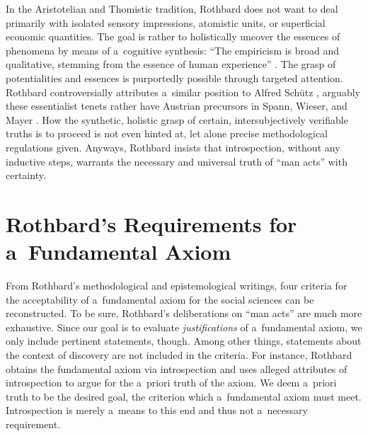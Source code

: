 In the Aristotelian and Thomistic tradition, Rothbard does not want to deal primarily with isolated sensory impressions, atomistic units, or superficial economic quantities. The goal is rather to holistically uncover the essences of phenomena by means of a~cognitive synthesis: ``The empiricism is broad and qualitative, stemming from the essence of human experience'' 
\parencite[][p.xvi]{mises_preface_2007}. %
 The grasp of potentialities and essences is purportedly possible through targeted attention. Rothbard controversially attributes a~similar position to Alfred Schütz 
\parencites[][]{rothbard_praxeology_2011}[][]{rothbard_praxeology:_1976}, %
 arguably these essentialist tenets rather have Austrian precursors in Spann, Wieser, and Mayer 
\parencites[][]{milford_abkopplung_1997}[][]{linsbichler_viel_2022}. %
 How the synthetic, holistic grasp of certain, intersubjectively verifiable truths is to proceed is not even hinted at, let alone precise methodological regulations given. Anyways, Rothbard insists that introspection, without any inductive steps, warrants the necessary and universal truth of ``man acts'' with certainty.



\section{Rothbard's Requirements for a~Fundamental Axiom }

From Rothbard's methodological and epistemological writings, four criteria for the acceptability of a~fundamental axiom for the social sciences can be reconstructed. To be sure, Rothbard's deliberations on ``man acts'' are much more exhaustive. Since our goal is to evaluate \textit{justifications} of a~fundamental axiom, we only include pertinent statements, though. Among other things, statements about the context of discovery are not included in the criteria. For instance, Rothbard obtains the fundamental axiom via introspection and uses alleged attributes of introspection to argue for the a~priori truth of the axiom. We deem a~priori truth to be the desired goal, the criterion which a~fundamental axiom must meet. Introspection is merely a~means to this end and thus not a~necessary requirement.



